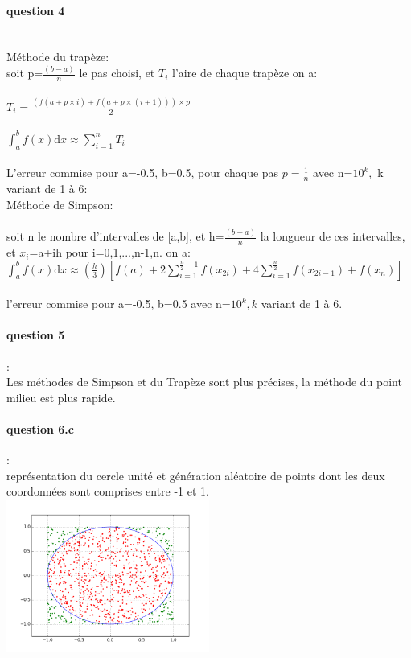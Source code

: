 \documentclass{article}
\begin{document}
\paragraph{question 4}
~~\\
Méthode du trapèze:
\\
soit p=$\frac{(b-a)}{n}$ le pas choisi, et $T_i$ l'aire de chaque trapèze on a:
\\ \\
$T_i=\frac{(f(a+p\times{i})+ f(a+p\times{(i+1)}))\times{p}}{2}$
\\ \\
$\int_{a}^{b}f(x)\mathrm dx \approx \sum_{i=1}^{n} T_i$
\\
\\
L'erreur commise pour a=-0.5, b=0.5, pour chaque pas $p=\frac{1}{n}$ avec n=$10^k,$ k variant de 1 à 6:
\\
Méthode de Simpson:
\\ \\
soit n le nombre d'intervalles de [a,b], et h=$\frac{(b-a)}{n}$ la longueur de ces intervalles, et $x_i$=a+ih pour {i=0,1,...,n-1,n.} on a:
\\
$\int_{a}^{b}f(x)\mathrm dx \approx (\frac{h}{3})[f(a)+ 2 \sum_{i=1}^{\frac{n}{2}-1} f(x_{2i})+4 \sum_{i=1}^{\frac{n}{2}} f(x_{2i-1}) + f(x_n)]$
\\ \\
l'erreur commise pour a=-0.5, b=0.5 avec n=$10^k, k$ variant de 1 à 6.
\\
\paragraph{question 5}:
~~\\
Les méthodes de Simpson et du Trapèze sont plus précises, la méthode du point milieu est plus rapide.
\paragraph{question 6.c}:
~~\\
représentation du cercle unité et génération aléatoire de points dont les deux coordonnées sont comprises entre -1 et 1.
\\
\includegraphics[height=5cm]{cercle.png}
\end{document}
